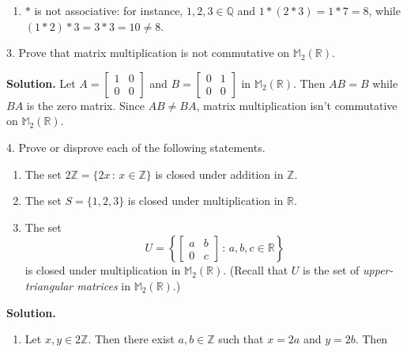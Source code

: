 \documentclass[10pt,]{book}
\theoremstyle{plain}
\theoremstyle{definition}
\theoremstyle{definition}
\theoremstyle{definition}
\theoremstyle{definition}
\numberwithin{equation}{section}
\def\Z{\mathbb{Z}}
\def\R{\mathbb{R}}
\def\Q{\mathbb{Q}}
\def\M{\mathbb{M}}
\newcommand{\amp}{&}
\begin{document}
\begin{exerciselist}
\begin{enumerate}[label=(\alph*)]
\item\hypertarget{li-67}{}\(*\) is not associative: for instance, \(1,2,3\in \Q\) and \(1*(2*3)=1*7=8\), while \((1*2)*3=3*3=10\neq 8\).%
\end{enumerate}
\item[3.]\hypertarget{exercise-9}{}Prove that matrix multiplication is not commutative on \(\M_2(\R)\).%
\par\smallskip
\par\smallskip
\noindent\textbf{Solution.}\hypertarget{solution-9}{}\quad
Let \(A=\begin{bmatrix}1 \amp 0 \\ 0 \amp 0\end{bmatrix}\) and \(B = \begin{bmatrix}0 \amp 1 \\ 0 \amp 0\end{bmatrix}\) in \(\M_2(\R)\). Then \(AB=B\) while \(BA\) is the zero matrix. Since \(AB\neq BA\), matrix multiplication isn't commutative on \(\M_2(\R)\).%
\item[4.]\hypertarget{exercise-10}{}Prove or disprove each of the following statements. \leavevmode%
\begin{enumerate}[label=(\alph*)]
\item\hypertarget{li-68}{}The set \(2\Z=\{2x\,:\,x\in \Z\}\) is closed under addition in \(\Z\).%
\item\hypertarget{li-69}{}The set \(S=\{1,2,3\}\) is closed under multiplication in \(\R\).%
\item\hypertarget{li-70}{}The set%
\begin{equation*}
U=\left\{
\begin{bmatrix}
a    \amp    b\\
0 \amp c \end{bmatrix}\,:\,a,b,c\in \R\right\}
\end{equation*}
is closed under multiplication in \(\M_2(\R)\). (Recall that \(U\) is  the set of \emph{upper-triangular matrices} in \(\M_2(\R)\).)%
\end{enumerate}
%
\par\smallskip
\par\smallskip
\noindent\textbf{Solution.}\hypertarget{solution-10}{}\quad
\leavevmode%
\begin{enumerate}[label=(\alph*)]
\item\hypertarget{li-71}{}Let \(x, y\in 2\Z\). Then there exist \(a,b\in \Z\) such that \(x=2a\) and \(y=2b\).  Then%
\begin{equation*}

\end{equation*}
\end{enumerate}
\end{exerciselist}
\end{document}
